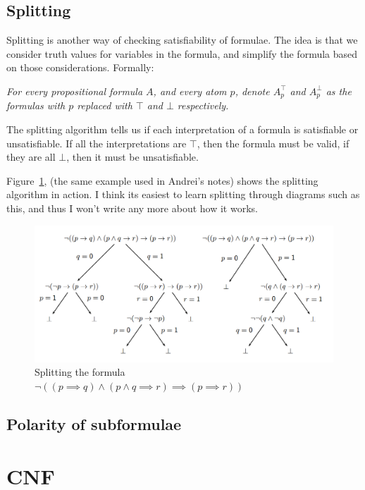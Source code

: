 \subsection{Splitting}

Splitting is another way of checking satisfiability of formulae. The idea is
that we consider truth values for variables in the formula, and simplify the
formula based on those considerations. Formally:

\textit{For every propositional formula $A$, and every atom $p$, denote
$A^{\top}_p$ and $A^{\bot}_p$ as the formulas with $p$ replaced with $\top$ and
$\bot$ respectively.}

The splitting algorithm tells us if each interpretation of a formula is
satisfiable or unsatisfiable. If all the interpretations are $\top$, then the
formula must be valid, if they are all $\bot$, then it must be unsatisfiable.

Figure~\ref{fig:andrei-split}, (the same example used in Andrei's notes) shows
the splitting algorithm in action. I think its easiest to learn splitting
through diagrams such as this, and thus I won't write any more about how it
works.

\begin{figure}[!h]
  \includegraphics[width=\textwidth]{diagrams/andrei-splitting}
  \caption{Splitting the formula $\neg((p \implies q) \wedge (p \wedge q \implies r) \implies (p \implies r))$}
  \label{fig:andrei-split}
\end{figure}

\subsection{Polarity of subformulae}

\section{CNF}

